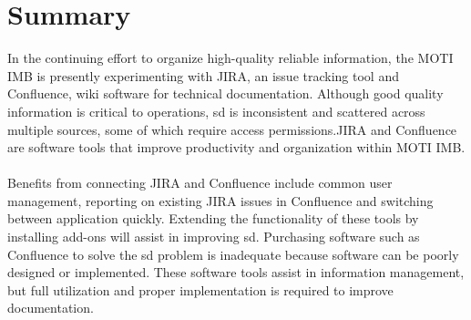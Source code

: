   \section*{Summary } 
  
 In the continuing effort to organize high-quality reliable information, the \gls{MOTI} \gls{IMB} is presently experimenting with \gls{JIRA}, an \gls{issue} tracking tool and \gls{Confluence}, \gls{wiki} software for technical documentation. Although good quality information is critical to operations, \gls{sd} is inconsistent and scattered across multiple sources, some of which require access permissions.\gls{JIRA} and Confluence are software tools that improve productivity and organization within MOTI IMB. \\ \\
 Benefits from connecting \gls{JIRA} and \gls{Confluence} include common user management, reporting on existing JIRA \glspl{issue} in \gls{Confluence} and switching between application quickly. Extending the functionality of these tools by installing add-ons will assist in improving \gls{sd}. Purchasing software such as \gls{Confluence} to solve the \gls{sd} problem is inadequate because software can be poorly designed or implemented. These software tools assist in information management, but full utilization and proper implementation is required to improve documentation.